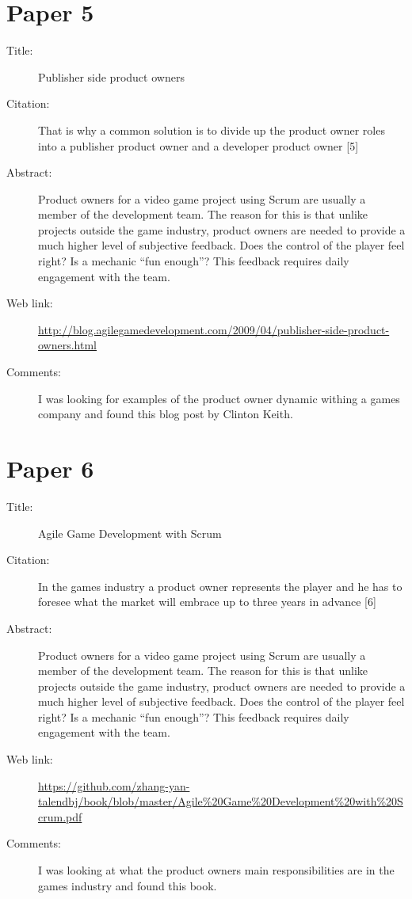 \documentclass{scrartcl}
\begin{document}
\section*{Paper 5}
\begin{description}
\item[Title:] Publisher side product owners
\item[Citation:] That is why a common solution is to divide up the product owner roles into a publisher product owner and a developer product owner [5]
\item[Abstract:] Product owners for a video game project using Scrum are usually a member of the development team. The reason for this is that unlike projects outside the game industry, product owners are needed to provide a much higher level of subjective feedback. Does the control of the player feel right? Is a mechanic “fun enough”? This feedback requires daily engagement with the team.
\item[Web link:] \url{http://blog.agilegamedevelopment.com/2009/04/publisher-side-product-owners.html}
\item[Comments:] I was looking for examples of the product owner dynamic withing a games company and found this blog post by Clinton Keith.
\end{description}

\section*{Paper 6}
\begin{description}
\item[Title:] Agile Game Development with Scrum
\item[Citation:] In the games industry a product owner represents the player and he has to foresee what the market will embrace up to three years in advance [6]
\item[Abstract:] Product owners for a video game project using Scrum are usually a member of the development team. The reason for this is that unlike projects outside the game industry, product owners are needed to provide a much higher level of subjective feedback. Does the control of the player feel right? Is a mechanic “fun enough”? This feedback requires daily engagement with the team.
\item[Web link:] \url{https://github.com/zhang-yan-talendbj/book/blob/master/Agile%20Game%20Development%20with%20Scrum.pdf}
\item[Comments:] I was looking at what the product owners main responsibilities are in the games industry and found this book.
\end{description}
\end{document}
